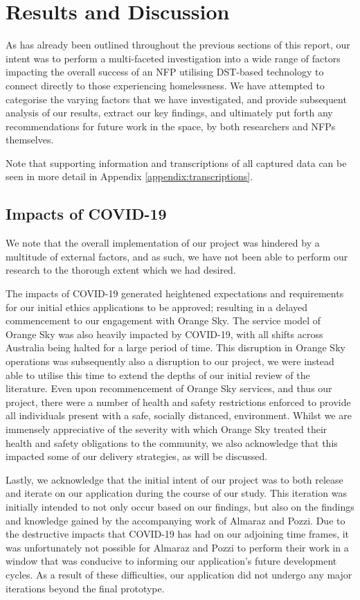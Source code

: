 \chapter{Results and Discussion}

As has already been outlined throughout the previous sections of this report, our intent was to perform a multi-faceted investigation into a wide range of factors impacting the overall success of an NFP utilising DST-based technology to connect directly to those experiencing homelessness. We have attempted to categorise the varying factors that we have investigated, and provide subsequent analysis of our results, extract our key findings, and ultimately put forth any recommendations for future work in the space, by both researchers and NFPs themselves.

Note that supporting information and transcriptions of all captured data can be seen in more detail in Appendix \ref{appendix:transcriptions}.

\section{Impacts of COVID-19}

We note that the overall implementation of our project was hindered by a multitude of external factors, and as such, we have not been able to perform our research to the thorough extent which we had desired.

The impacts of COVID-19 generated heightened expectations and requirements for our initial ethics applications to be approved; resulting in a delayed commencement to our engagement with Orange Sky. The service model of Orange Sky was also heavily impacted by COVID-19, with all shifts across Australia being halted for a large period of time. This disruption in Orange Sky operations was subsequently also a disruption to our project, we were instead able to utilise this time to extend the depths of our initial review of the literature. Even upon recommencement of Orange Sky services, and thus our project, there were a number of health and safety restrictions enforced to provide all individuals present with a safe, socially distanced, environment. Whilst we are immensely appreciative of the severity with which Orange Sky treated their health and safety obligations to the community, we also acknowledge that this impacted some of our delivery strategies, as will be discussed.

Lastly, we acknowledge that the initial intent of our project was to both release and iterate on our application during the course of our study. This iteration was initially intended to not only occur based on our findings, but also on the findings and knowledge gained by the accompanying work of Almaraz and Pozzi. Due to the destructive impacts that COVID-19 has had on our adjoining time frames, it was unfortunately not possible for Almaraz and Pozzi to perform their work in a window that was conducive to informing our application's future development cycles. As a result of these difficulties, our application did not undergo any major iterations beyond the final prototype.

